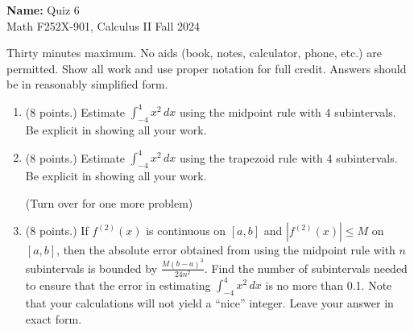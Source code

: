 \documentclass[12pt]{article}
\newcommand{\ds}{\displaystyle}
\newcommand{\points}[1]{(#1 points.)}		%
\begin{document}
\pagestyle{plain}

\noindent \textbf{Name:} \underline{\hspace{15em}}		\hfill	Quiz 6 \\
           Math F252X-901, Calculus II  			\hfill	Fall 2024 	

                \vspace{1cm}
                
Thirty minutes maximum. No aids (book, notes,
calculator, phone, etc.) are permitted. Show all work and use proper
notation for full credit. Answers should be in reasonably simplified
form.

\begin{enumerate}

\item \points{8} Estimate $\ds \int_{-4}^4 x^2 \, dx$ using the midpoint
  rule with 4 subintervals. Be explicit in showing all your work.
  \vfill
  
\item \points{8} Estimate $\ds \int_{-4}^4 x^2 \, dx$ using the trapezoid
  rule with 4 subintervals. Be explicit in showing all your work.
  \vfill

  (Turn over for one more problem)

  \newpage

\item \points{8} If $f^{(2)}(x)$ is continuous on $[a,b]$ 
  and $|f^{(2)}(x)| \leq M$ on $[a,b]$, then the
  absolute error obtained from using the midpoint rule with $n$
  subintervals is bounded by $\ds \frac{M(b-a)^3}{24n^2}$. Find the
  number of subintervals needed to ensure that the error in estimating
  $\ds \int_{-4}^4 x^2 \, dx$ is no more than 0.1. Note that your
  calculations will not yield a ``nice'' integer. Leave your answer in
  exact form.
\end{enumerate}
\end{document}

